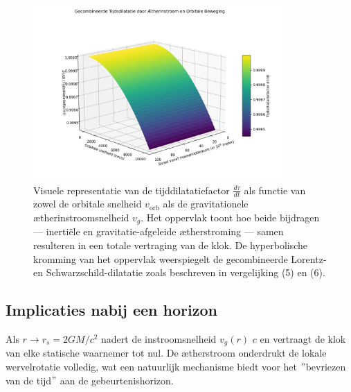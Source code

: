 \begin{figure}[htbp]
    \centering
    \includegraphics[width=0.85\textwidth]{images/09-CombinedTimeDilationSurface_nl}
    \caption{Visuele representatie van de tijddilatatiefactor \( \frac{d\tau}{dt} \) als functie van zowel de orbitale snelheid \( v_\text{orb} \) als de gravitationele ætherinstroomsnelheid \( v_g \). Het oppervlak toont hoe beide bijdragen — inertiële en gravitatie-afgeleide ætherstroming — samen resulteren in een totale vertraging van de klok. De hyperbolische kromming van het oppervlak weerspiegelt de gecombineerde Lorentz- en Schwarzschild-dilatatie zoals beschreven in vergelijking (5) en (6).}
    \label{fig:TimeDialationCombined}
\end{figure}

\subsection*{Implicaties nabij een horizon}

Als $r \to r_s = 2GM/c^2$ nadert de instroomsnelheid $v_g(r)$ $c$ en vertraagt de klok van elke statische waarnemer tot nul. De ætherstroom onderdrukt de lokale wervelrotatie volledig, wat een natuurlijk mechanisme biedt voor het \("\)bevriezen van de tijd\("\) aan de gebeurtenishorizon.


